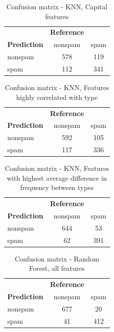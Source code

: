 \documentclass{article}\usepackage[]{graphicx}\usepackage[]{xcolor}
\begin{document}
\begin{table}[h]
    \centering
    \begin{tabular}{lcc}
        & \textbf{Reference} & \\
        \textbf{Prediction} & nonspam & spam \\
        nonspam & 578 & 119 \\
        spam & 112 & 341 \\
    \end{tabular}
    \caption{Confusion matrix - KNN, Capital features}
    \label{KNNcm3}
\end{table}

\begin{table}[h]
    \centering
    \begin{tabular}{lcc}
        & \textbf{Reference} & \\
        \textbf{Prediction} & nonspam & spam \\
        nonspam & 592 & 105 \\
        spam & 117 & 336 \\
    \end{tabular}
    \caption{Confusion matrix - KNN, Features highly correlated with type}
    \label{KNNcm4}
\end{table}

\begin{table}[h]
    \centering
    \begin{tabular}{lcc}
        & \textbf{Reference} & \\
        \textbf{Prediction} & nonspam & spam \\
        nonspam & 644 & 53 \\
        spam & 62 & 391 \\
    \end{tabular}
    \caption{Confusion matrix - KNN, Features with highest average difference in frequency between types}
    \label{KNNcm5}
\end{table}

\begin{table}[h]
    \centering
    \begin{tabular}{lcc}
        & \textbf{Reference} & \\
        \textbf{Prediction} & nonspam & spam \\
        nonspam & 677 & 20 \\
        spam & 41 & 412 \\
    \end{tabular}
    \caption{Confusion matrix - Random Forest, all features}
    \label{RFcm1}
\end{table}
\end{document}
